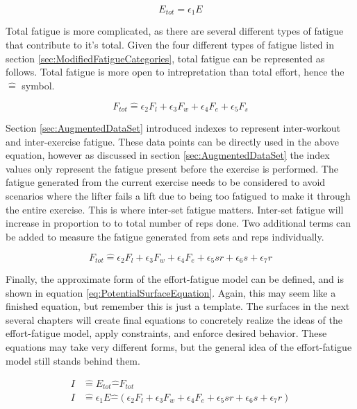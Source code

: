 \begin{equation}
	\label{eq:TotalEffort}
	E_{tot}=\epsilon_1 E
\end{equation}

Total fatigue is more complicated, as there are several different types of fatigue that contribute to it's total. Given the four different types of fatigue listed in section \ref{sec:ModifiedFatigueCategories}, total fatigue can be represented as follows. Total fatigue is more open to intrepretation than total effort, hence the $\hat{=}$ symbol.

\begin{equation*}
	F_{tot} \hat{=} \epsilon_2 F_l+\epsilon_3 F_w+\epsilon_4 F_e+\epsilon_5 F_s
\end{equation*}

Section \ref{sec:AugmentedDataSet} introduced indexes to represent inter-workout and inter-exercise fatigue. These data points can be directly used in the above equation, however as discussed in section \ref{sec:AugmentedDataSet} the index values only represent the fatigue present before the exercise is performed. The fatigue generated from the current exercise needs to be considered to avoid scenarios where the lifter fails a lift due to being too fatigued to make it through the entire exercise. This is where inter-set fatigue matters. Inter-set fatigue will increase in proportion to to total number of reps done. Two additional terms can be added to measure the fatigue generated from sets and reps individually.

\begin{equation*}
	F_{tot} \hat{=} \epsilon_2 F_l+\epsilon_3 F_w+\epsilon_4 F_e+\epsilon_5 sr+\epsilon_6 s+\epsilon_7 r
\end{equation*}

Finally, the approximate form of the effort-fatigue model can be defined, and is shown in equation \ref{eq:PotentialSurfaceEquation}. Again, this may seem like a finished equation, but remember this is just a template. The surfaces in the next several chapters will create final equations to concretely realize the ideas of the effort-fatigue model, apply constraints, and enforce desired behavior. These equations may take very different forms, but the general idea of the effort-fatigue model still stands behind them.

\begin{equation}
	\label{eq:PotentialSurfaceEquation}
	\begin{split}
		I & \hat{=} E_{tot}\hat{-}F_{tot} \\
		I & \hat{=} \epsilon_1 E\hat{-}\left( 
			\epsilon_2 F_l+\epsilon_3 F_w+\epsilon_4 F_e+\epsilon_5 sr+\epsilon_6 s+\epsilon_7 r
		\right)
	\end{split}
\end{equation}

